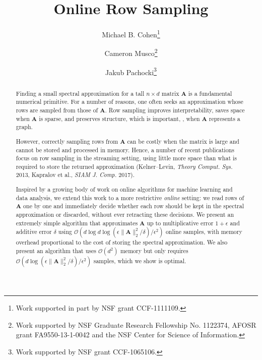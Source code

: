 \documentclass{toc}
\newcommand{\Oh}{\ensuremath{\mathcal{O}}}
\newcommand{\bv}[1]{\mathbf{#1}}
\newcommand{\norm}[1]{\|#1\|}
\begin{document}
\begin{frontmatter} %
  
%
\title{Online Row Sampling}  %

%
%

%
%
%

%
%
%
%
%
%
%
%
%
%
%
%


%
%
%
%

%

\author[cohen]{Michael B. Cohen\thanks{Work supported in part by NSF grant CCF-1111109.}}
\author[musco]{Cameron Musco\thanks{Work supported by NSF Graduate Research Fellowship No. 1122374, AFOSR grant FA9550-13-1-0042 and the NSF Center for Science of Information.}}
\author[pachocki]{Jakub Pachocki\thanks{Work supported by NSF grant CCF-1065106. }}

%
%
%
%

%
%
%
%
%
%
\begin{abstract}
 Finding a small spectral approximation for a tall $n \times d$ matrix $\bv A$ is a fundamental numerical primitive.
For a number of reasons, one often seeks an approximation whose rows are sampled from those of $\bv{A}$. Row sampling improves interpretability, saves space when $\bv A$ is sparse, and preserves structure, which is important, \eg, when $\bv A$ represents a graph.

However, correctly sampling rows from $\bv{A}$ can be costly when the matrix is large and cannot be stored and processed in memory. Hence, a number of recent publications focus on row sampling in the streaming setting, using little more space than what is required to store the returned approximation
%
(Kelner--Levin, \emph{Theory Comput. Sys.} 2013,
Kapralov et al., \emph{SIAM J. Comp.} 2017). %

Inspired by a growing body of work on online algorithms for machine learning and data analysis, we extend this work to a more restrictive \emph{online} setting: we read rows of $\bv A$ one by one and immediately decide whether each row should be kept in the spectral approximation or discarded, without ever retracting these decisions. We present an extremely simple algorithm that approximates $\bv A$ up to multiplicative error $1+\epsilon$ and additive error $\delta$ using
$\Oh(d \log d \log (\epsilon\norm{\bv A}_2^2/\delta) / \epsilon^2)$ online samples, with memory overhead proportional to the cost of storing the spectral approximation.
We also present an algorithm that uses $\Oh(d^2)$ memory but only requires $\Oh(d \log (\epsilon\norm{\bv A}_2^2/\delta) / \epsilon^2)$ samples, which we show is optimal.


\end{abstract}
\end{frontmatter}
\end{document}
